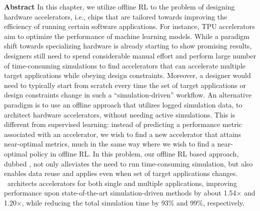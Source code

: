 \documentclass[../thesis.tex]{subfiles}
\begin{document}

% 

% 
% 
% 
% 
% 
% 

\vspace{-0.4cm}
\begin{AIbox}{\large{\textbf{Abstract}}}
\vspace{4mm}
In this chapter, we utilize offline RL to the problem of designing hardware accelerators, i.e., chips that are tailored towards improving the efficiency of running certain software applications. For instance, TPU accelerators aim to optimize the performance of machine learning models. While a paradigm shift towards specializing hardware is already starting to show promising results, designers still need to spend considerable manual effort and perform large number of time-consuming simulations to find accelerators that can accelerate multiple target applications while obeying design constraints. Moreover, a designer would need to typically start from scratch every time the set of target applications or design constraints change in such a ``simulation-driven'' workflow. An alternative paradigm is to use an offline approach that utilizes logged simulation data, to architect hardware accelerators, without needing active simulations. This is different from supervised learning: instead of predicting a performance metric associated with an accelerator, we wish to find a new accelerator that attains  near-optimal metrics, much in the same way where we wish to find a near-optimal policy in offline RL. In this problem, our offline RL based approach, dubbed \primemethodname, not only alleviates the need to run time-consuming simulation, but also enables data reuse and applies even when set of target applications changes.
\primemethodname\ architects accelerators for both single and multiple applications, improving performance upon state-of-the-art simulation-driven methods by about 1.54$\times$ and 1.20$\times$, while reducing the total simulation time by 93\% and 99\%, respectively.
\vspace{2mm}
\end{AIbox}









\end{document}
